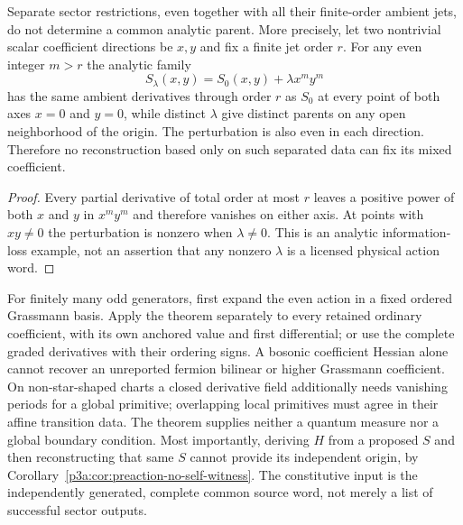 \documentclass[12pt,a4paper]{article}
\begin{document}
\begin{corollary}
\label{p3a:cor:v246-sector-restriction-kernel}
Separate sector restrictions, even together with all their finite-order
ambient jets, do not determine a common analytic parent. More precisely,
let two nontrivial scalar coefficient directions be $x,y$ and fix a finite
jet order $r$. For any even integer $m>r$ the analytic family
\[
 S_\lambda(x,y)=S_0(x,y)+\lambda x^m y^m
\]
has the same ambient derivatives through order $r$ as $S_0$ at every
point of both axes $x=0$ and $y=0$, while distinct $\lambda$ give
distinct parents on any open neighborhood of the origin. The perturbation
is also even in each direction. Therefore no reconstruction based only
on such separated data can fix its mixed coefficient.
\end{corollary}
\begin{proof}
Every partial derivative of total order at most $r$ leaves a positive
power of both $x$ and $y$ in $x^my^m$ and therefore vanishes on either
axis. At points with $xy\ne0$ the perturbation is nonzero when
$\lambda\ne0$. This is an analytic information-loss example, not an
assertion that any nonzero $\lambda$ is a licensed physical action word.
\end{proof}

\begin{remark}
\label{p3a:rem:v246-parent-reconstruction-scope}
For finitely many odd generators, first expand the even action in a fixed
ordered Grassmann basis. Apply the theorem separately to every retained
ordinary coefficient, with its own anchored value and first differential;
or use the complete graded derivatives with their ordering signs. A bosonic
coefficient Hessian alone cannot recover an unreported fermion bilinear or
higher Grassmann coefficient. On non-star-shaped charts a closed derivative
field additionally needs vanishing periods for a global primitive; overlapping
local primitives must agree in their affine transition data. The theorem
supplies neither a quantum measure nor a global boundary condition.
Most importantly, deriving $H$ from a proposed $S$ and then reconstructing
that same $S$ cannot provide its independent origin, by
Corollary~\ref{p3a:cor:preaction-no-self-witness}. The constitutive input is
the independently generated, complete common source word, not merely a list
of successful sector outputs.
\end{remark}
\end{document}
